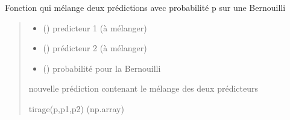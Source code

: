 \documentclass[letterpaper,10pt,french]{sphinxmanual}
\begin{document}

\begin{fulllineitems}
\label{\detokenize{methode_fait_maison:methode_fait_maison.pred_mel}}
\pysigstartsignatures
{}
\pysigstopsignatures
\sphinxAtStartPar
Fonction qui mélange deux prédictions avec probabilité p sur une Bernouilli
\begin{quote}\begin{description}
\begin{itemize}
\item {} 
\sphinxAtStartPar
{} () \textendash{} predicteur 1 (à mélanger)

\item {} 
\sphinxAtStartPar
{} () \textendash{} prédicteur 2 (à mélanger)

\item {} 
\sphinxAtStartPar
{} () \textendash{} probabilité pour la Bernouilli

\end{itemize}

\sphinxAtStartPar
nouvelle prédiction contenant le mélange des deux prédicteurs

\sphinxAtStartPar
tirage(p,p1,p2) (np.array)

\end{description}\end{quote}

\end{fulllineitems}

\end{document}
